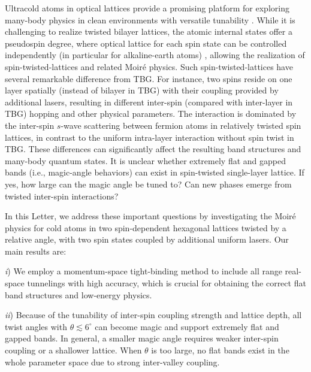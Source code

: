 \documentclass[twocolumn,english,prl,floatfix,citeautoscript,nofootinbib]{revtex4}
\begin{document}
Ultracold atoms in optical lattices provide a promising platform for
exploring many-body physics in clean environments with versatile tunability
\cite{PhysRevLett.81.3108,adv.phys.ultracold,
annurev.Esslinger,nphys2259,RevModPhys.87.637,nature10871,science.aad5812,
nphys1108,3Dclockfermi,clock173Yb,clock87Sr,2D.Materials,arxiv.1809.04604,PhysRevB.101.235121,PhysRevLett.125.030504,RevModPhys.82.1225,alkaline.earth.feshbach}%
. While it is challenging to realize twisted bilayer lattices, the atomic
internal states offer a pseudospin degree, where optical lattice for each
spin state can be controlled independently (in particular for alkaline-earth
atoms) \cite%
{PhysRevA.78.032508,PhysRevLett.101.170504,PhysRevLett.120.143601,PhysRevA.100.053604}%
, allowing the realization of spin-twisted-lattices and related Moir\'{e}
physics. Such spin-twisted-lattices have several remarkable difference from
TBG. For instance, two spins reside on one layer spatially
(instead of bilayer in TBG) with their coupling provided by additional
lasers, resulting in different inter-spin (compared with inter-layer in TBG)
hopping and other physical parameters. The interaction is dominated by the
inter-spin $s$-wave scattering between fermion atoms in relatively twisted spin
lattices, in contrast to the uniform intra-layer interaction
without spin twist in TBG. These differences can significantly affect the
resulting band structures and many-body quantum states. It is unclear
whether extremely flat and gapped bands (i.e., magic-angle behaviors) can
exist in spin-twisted single-layer lattice. If yes, how large can the magic
angle be tuned to? Can new phases emerge from twisted inter-spin
interactions?

In this Letter, we address these important questions by investigating the
Moir\'{e} physics for cold atoms in two spin-dependent hexagonal lattices
twisted by a relative angle, with two spin states coupled by additional
uniform lasers. Our main results are:

\textit{i}) We employ a momentum-space tight-binding method to include all
range real-space tunnelings with high accuracy, which is crucial for
obtaining the correct flat band structures and low-energy physics.

\textit{ii}) Because of the tunability of inter-spin coupling strength and
lattice depth, all twist angles with $\theta \lesssim 6^{\circ }$ can become
magic and support extremely flat and gapped bands. In general, a smaller
magic angle requires weaker inter-spin coupling or a shallower lattice. When
$\theta $ is too large, no flat bands exist in the whole parameter space due
to strong inter-valley coupling.
\end{document}
